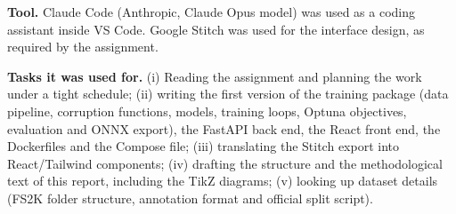 \textbf{Tool.} Claude Code (Anthropic, Claude Opus model) was used as a coding assistant inside VS Code. Google Stitch was used for the interface design, as required by the assignment.

\textbf{Tasks it was used for.} (i) Reading the assignment and planning the work under a tight schedule; (ii) writing the first version of the training package (data pipeline, corruption functions, models, training loops, Optuna objectives, evaluation and ONNX export), the FastAPI back end, the React front end, the Dockerfiles and the Compose file; (iii) translating the Stitch export into React/Tailwind components; (iv) drafting the structure and the methodological text of this report, including the TikZ diagrams; (v) looking up dataset details (FS2K folder structure, annotation format and official split script).


